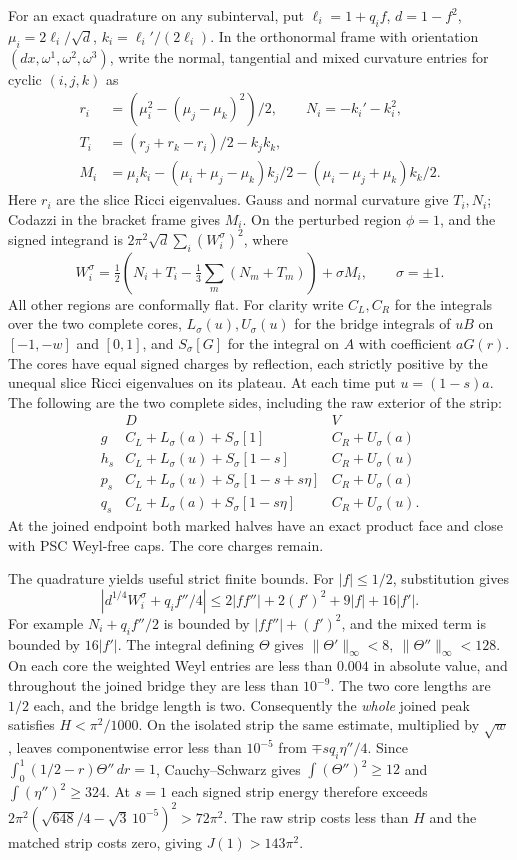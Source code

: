 \documentclass[11pt,letterpaper]{article}
\numberwithin{equation}{section}
\begin{document}
For an exact quadrature on any subinterval, put
\(\ell_i=1+q_if\), \(d=1-f^2\),
\(\mu_i=2\ell_i/\sqrt d\), \(k_i=\ell_i'/(2\ell_i)\).
In the orthonormal frame with orientation \((dx,\omega^1,\omega^2,\omega^3)\),
write the normal, tangential and mixed curvature entries for cyclic
\((i,j,k)\) as
\[
\begin{aligned}
 r_i&=(\mu_i^2-(\mu_j-\mu_k)^2)/2,\qquad N_i=-k_i'-k_i^2,\\
 T_i&=(r_j+r_k-r_i)/2-k_jk_k,\\
 M_i&=\mu_i k_i-(\mu_i+\mu_j-\mu_k)k_j/2
                   -(\mu_i-\mu_j+\mu_k)k_k/2.
\end{aligned}
\]
Here \(r_i\) are the slice Ricci eigenvalues. Gauss and normal
curvature give \(T_i,N_i\); Codazzi in the bracket frame gives
\(M_i\). On the perturbed region \(\phi=1\), and the signed
integrand is \(2\pi^2\sqrt d\sum_i(W_i^\sigma)^2\), where
\[
 W_i^\sigma=\tfrac12\left(N_i+T_i-\tfrac13\sum_m(N_m+T_m)\right)
                 +\sigma M_i,\qquad \sigma=\pm1 .
\]
All other regions are conformally flat. For clarity write
\(C_L,C_R\) for the integrals over the two complete cores,
\(L_\sigma(u),U_\sigma(u)\) for the bridge integrals of \(uB\)
on \([-1,-w]\) and \([0,1]\), and \(S_\sigma[G]\) for the
integral on \(A\) with coefficient \(aG(r)\). The cores have
equal signed charges by reflection, each strictly positive by
the unequal slice Ricci eigenvalues on its plateau. At each time
put \(u=(1-s)a\). The following are the two complete sides,
including the raw exterior of the strip:
\[
\begin{array}{c|ll}
 &D&V\\ \hline
g&C_L+L_\sigma(a)+S_\sigma[1]&C_R+U_\sigma(a)\\
h_s&C_L+L_\sigma(u)+S_\sigma[1-s]&C_R+U_\sigma(u)\\
p_s&C_L+L_\sigma(u)+S_\sigma[1-s+s\eta]&C_R+U_\sigma(a)\\
q_s&C_L+L_\sigma(a)+S_\sigma[1-s\eta]&C_R+U_\sigma(u).
\end{array}
\]
At the joined endpoint both marked halves have an exact product
face and close with PSC Weyl-free caps. The core charges remain.

The quadrature yields useful strict finite bounds. For
\(|f|\le1/2\), substitution gives
\[
 |d^{1/4}W_i^\sigma+q_if''/4|
 \le 2|ff''|+2(f')^2+9|f|+16|f'|.
\]
For example \(N_i+q_if''/2\) is bounded by
\(|ff''|+(f')^2\), and the mixed term is bounded by \(16|f'|\).
The integral defining \(\Theta\) gives
\(\|\Theta'\|_\infty<8,\ \|\Theta''\|_\infty<128\).
On each core the weighted Weyl entries are less than \(0.004\)
in absolute value, and throughout the joined bridge they are
less than \(10^{-9}\). The two core lengths are \(1/2\) each,
and the bridge length is two. Consequently the \emph{whole}
joined peak satisfies \(H<\pi^2/1000\).
On the isolated strip the same estimate, multiplied by
\(\sqrt w\), leaves componentwise error less than \(10^{-5}\)
from \(\mp s q_i\eta''/4\). Since
\(\int_0^1(1/2-r)\Theta''\,dr=1\), Cauchy--Schwarz gives
\(\int(\Theta'')^2\ge12\) and \(\int(\eta'')^2\ge324\).
At \(s=1\) each signed strip energy therefore exceeds
\(2\pi^2(\sqrt{648}/4-\sqrt3\,10^{-5})^2>72\pi^2\).
The raw strip costs less than \(H\) and the matched strip costs
zero, giving \(J(1)>143\pi^2\).
\end{document}

